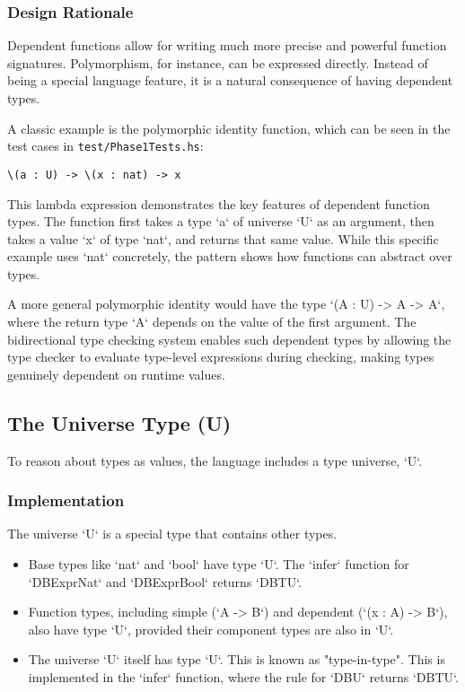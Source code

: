 \subsubsection{Design Rationale}
Dependent functions allow for writing much more precise and powerful function signatures. Polymorphism, for instance, can be expressed directly. Instead of being a special language feature, it is a natural consequence of having dependent types.

A classic example is the polymorphic identity function, which can be seen in the test cases in \texttt{test/Phase1Tests.hs}:
\begin{verbatim}
\(a : U) -> \(x : nat) -> x
\end{verbatim}
This lambda expression demonstrates the key features of dependent function types. The function first takes a type `a` of universe `U` as an argument, then takes a value `x` of type `nat`, and returns that same value. While this specific example uses `nat` concretely, the pattern shows how functions can abstract over types.

A more general polymorphic identity would have the type `(A : U) -> A -> A`, where the return type `A` depends on the value of the first argument. The bidirectional type checking system enables such dependent types by allowing the type checker to evaluate type-level expressions during checking, making types genuinely dependent on runtime values.

\subsection{The Universe Type (U)}

To reason about types as values, the language includes a type universe, `U`.

\subsubsection{Implementation}
The universe `U` is a special type that contains other types.
\begin{itemize}
    \item Base types like `nat` and `bool` have type `U`. The `infer` function for `DBExprNat` and `DBExprBool` returns `DBTU`.
    \item Function types, including simple (`A -> B`) and dependent (`(x : A) -> B`), also have type `U`, provided their component types are also in `U`.
    \item The universe `U` itself has type `U`. This is known as "type-in-type". This is implemented in the `infer` function, where the rule for `DBU` returns `DBTU`.
\end{itemize}

